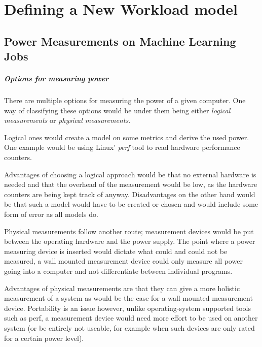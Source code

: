 \chapter{Defining a New Workload model}

\section{Power Measurements on Machine Learning Jobs}
\label{sec:power_measurements}


\paragraph{Options for measuring power}

There are multiple options for measuring the power of a given computer. One way of classifying these options would be under them being either \emph{logical measurements} or \emph{physical measurements}.

Logical ones would create a model on some metrics and derive the used power. One example would be using Linux' \emph{perf} tool to read hardware performance counters. 

Advantages of choosing a logical approach would be that no external hardware is needed and that the overhead of the measurement would be low, as the hardware counters are being kept track of anyway. 
Disadvantages on the other hand would be that such a model would have to be created or chosen and would include some form of error as all models do.

Physical measurements follow another route; measurement devices would be put between the operating hardware and the power supply. 
The point where a power measuring device is inserted would dictate what could and could not be measured, a wall mounted measurement device could only measure all power going into a computer and not differentiate between individual programs.

Advantages of physical measurements are that they can give a more holistic measurement of a system as would be the case for a wall mounted measurement device. 
Portability is an issue however, unlike operating-system supported tools such as perf, a measurement device would need more effort to be used on another system (or be entirely not useable, for example when such devices are only rated for a certain power level).

